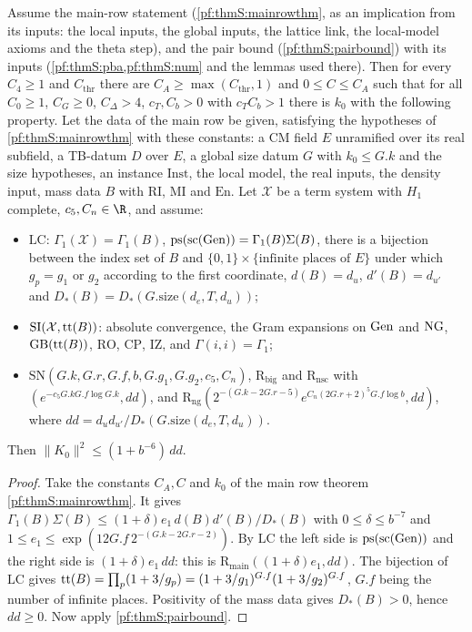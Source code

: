 \begin{theorem}\label{pf:thmS:pbfromlocal}
Assume the main-row statement (\cref{pf:thmS:mainrowthm}, as an implication from its inputs: the local inputs, the global inputs, the lattice link, the local-model axioms and the theta step), and
the pair bound (\cref{pf:thmS:pairbound}) with its inputs (\cref{pf:thmS:pba,pf:thmS:num} and the lemmas used there).
Then for every $C_4\ge1$ and $C_{\mathrm{thr}}$ there are $C_A\ge\max(C_{\mathrm{thr}},1)$ and $0\le C\le C_A$ such that
for all $C_0\ge1$, $C_G\ge0$, $C_\Delta>4$, $c_T,C_b>0$ with $c_TC_b>1$ there is $k_0$ with the following property. Let
the data of the main row be given, satisfying the hypotheses of \cref{pf:thmS:mainrowthm} with these constants: a CM
field $E$ unramified over its real subfield, a TB-datum $D$ over $E$, a global size datum $G$ with $k_0\le G.k$ and the
size hypotheses, an instance $\mathrm{Inst}$, the local model, the real inputs, the density input, mass data $B$ with
$\mathrm{RI}$, $\mathrm{MI}$ and $\mathrm{En}$. Let $\mathcal X$ be a term system with $H_1$
complete, $c_5,C_n\in\R$, and assume:
\begin{itemize}
\item $\mathrm{LC}$: $\Gamma_1(\mathcal X)=\Gamma_1(B)$, $\operatorname{ps}(\mathrm{sc}(\mathrm{Gen}))=\Gamma_1(B)\Sigma(B)$, there is a
bijection between the index set of $B$ and $\{0,1\}\times\{\text{infinite places of }E\}$ under which $g_p=g_1$ or $g_2$
according to the first coordinate, $d(B)=d_u$, $d'(B)=d_{u'}$ and $D_*(B)=D_*(G.\mathrm{size}(d_e,T,d_u))$;
\item $\mathrm{SI}(\mathcal X,\mathrm{tt}(B))$: absolute convergence, the Gram expansions on $\mathrm{Gen}$ and
$\mathrm{NG}$, $\mathrm{GB}(\mathrm{tt}(B))$, $\mathrm{RO}$, $\mathrm{CP}$, $\mathrm{IZ}$, and $\Gamma(i,i)=\Gamma_1$;
\item $\mathrm{SN}(G.k,G.r,G.f,b,G.g_1,G.g_2,c_5,C_n)$, $\mathrm{R}_{\mathrm{big}}$ and $\mathrm{R}_{\mathrm{nsc}}$ with
$(e^{-c_5G.kG.f\log G.k},dd)$, and $\mathrm{R}_{\mathrm{ng}}(2^{-(G.k-2G.r-5)}e^{C_n(2G.r+2)^5G.f\log b},dd)$, where
$dd=d_ud_{u'}/D_*(G.\mathrm{size}(d_e,T,d_u))$.
\end{itemize}
Then $\|K_0\|^2\le(1+b^{-6})\,dd$.
\end{theorem}

\begin{proof}
Take the constants $C_A,C$ and $k_0$ of the main row theorem \cref{pf:thmS:mainrowthm}. It gives
$\Gamma_1(B)\Sigma(B)\le(1+\delta)e_1\,d(B)d'(B)/D_*(B)$ with $0\le\delta\le b^{-7}$ and $1\le e_1\le
\exp(12G.f\,2^{-(G.k-2G.r-2)})$. By $\mathrm{LC}$ the left side is $\operatorname{ps}(\mathrm{sc}(\mathrm{Gen}))$ and the right
side is $(1+\delta)e_1\,dd$: this is $\mathrm{R}_{\mathrm{main}}((1+\delta)e_1,dd)$. The bijection of $\mathrm{LC}$ gives
$\mathrm{tt}(B)=\prod_p(1+3/g_p)=(1+3/g_1)^{G.f}(1+3/g_2)^{G.f}$, $G.f$ being the number of infinite places. Positivity of
the mass data gives $D_*(B)>0$, hence $dd\ge0$. Now apply \cref{pf:thmS:pairbound}.
\end{proof}

